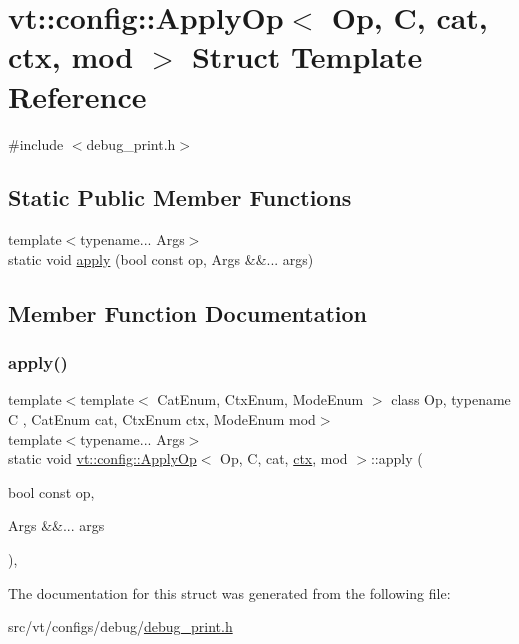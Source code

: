 \hypertarget{structvt_1_1config_1_1_apply_op}{}\section{vt\+:\+:config\+:\+:Apply\+Op$<$ Op, C, cat, ctx, mod $>$ Struct Template Reference}
\label{structvt_1_1config_1_1_apply_op}


{\ttfamily \#include $<$debug\+\_\+print.\+h$>$}

\subsection*{Static Public Member Functions}
\begin{DoxyCompactItemize}
\item 
{\footnotesize template$<$typename... Args$>$ }\\static void \hyperlink{structvt_1_1config_1_1_apply_op_a4c3dda44da5f0b16c37656f398ba4639}{apply} (bool const op, Args \&\&... args)
\end{DoxyCompactItemize}


\subsection{Member Function Documentation}
\mbox{\label{structvt_1_1config_1_1_apply_op_a4c3dda44da5f0b16c37656f398ba4639}} 
\subsubsection{\texorpdfstring{apply()}{apply()}}
{\footnotesize\ttfamily template$<$template$<$ Cat\+Enum, Ctx\+Enum, Mode\+Enum $>$ class Op, typename C , Cat\+Enum cat, Ctx\+Enum ctx, Mode\+Enum mod$>$ \\
template$<$typename... Args$>$ \\
static void \hyperlink{structvt_1_1config_1_1_apply_op}{vt\+::config\+::\+Apply\+Op}$<$ Op, C, cat, \hyperlink{namespacevt_1_1config_a0551245b6b893932b95aaf8eac94eed1}{ctx}, mod $>$\+::apply (\begin{DoxyParamCaption}\item[{bool const}]{op,  }\item[{Args \&\&...}]{args }\end{DoxyParamCaption})\hspace{0.3cm}{\ttfamily [inline]}, {\ttfamily [static]}}



The documentation for this struct was generated from the following file\+:\begin{DoxyCompactItemize}
\item 
src/vt/configs/debug/\hyperlink{debug__print_8h}{debug\+\_\+print.\+h}\end{DoxyCompactItemize}
